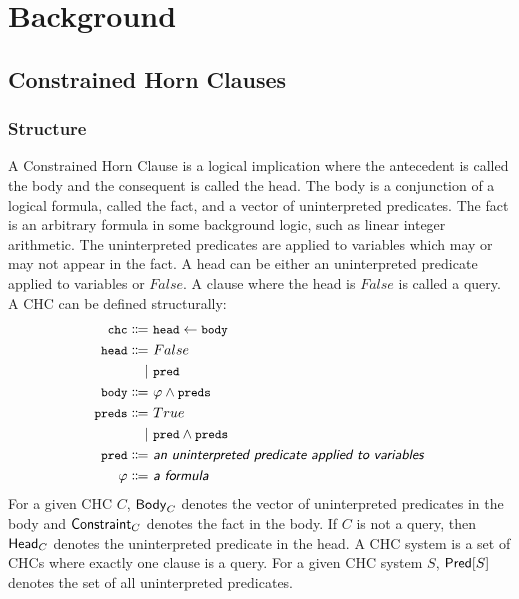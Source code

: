 \section{Background}
\label{sec:background}

\subsection{Constrained Horn Clauses}
\label{sec:chcs}

\subsubsection{Structure}
A Constrained Horn Clause is a logical implication where the
antecedent is called the body and the consequent is called the head.
%
The body is a conjunction of a logical formula, called the fact,
and a vector of uninterpreted predicates. The fact is an arbitrary
formula in some background logic, such as linear integer arithmetic.
%
The uninterpreted predicates are applied to variables which may or may
not appear in the fact.
%
A head can be either an uninterpreted predicate applied to variables or $False$.
%
A clause where the head is $False$ is called a query. A CHC can be
defined structurally:
\begin{align*}
\cc{chc} \Coloneqq&~\cc{head} \gets \cc{body} \\
\cc{head} \Coloneqq&~False \\
  \mid&~\cc{pred} \\
\cc{body} \Coloneqq&~\varphi \wedge \cc{preds} \\
\cc{preds} \Coloneqq&~True \\
  \mid&~\cc{pred} \wedge \cc{preds} \\
\cc{pred} \Coloneqq&~\textsf{\emph{an uninterpreted predicate applied to variables}} \\
\varphi \Coloneqq&~\textsf{\emph{a formula}} \\
\end{align*}
%
For a given CHC $C$, $\mathsf{Body}_{C}$ denotes the vector of uninterpreted
predicates in the body and $\mathsf{Constraint}_{C}$ denotes the fact in the
body.
%
If $C$ is not a query, then $\mathsf{Head}_{C}$ denotes the uninterpreted
predicate in the head.
%
A CHC system is a set of CHCs where exactly one clause is a query.
%
For a given CHC system $S$, $\mathsf{Pred}[ S ]$ denotes the set of all
uninterpreted predicates.


